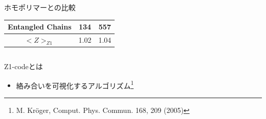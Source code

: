 \documentclass[12pt, dvipdfmx]{beamer}
\begin{document}
\begin{frame}
\begin{columns}[T, onlytextwidth]
\begin{block}{ホモポリマーとの比較}
\begin{center}
\begin{tabular}{c||c|c}
                        Entangled Chains&134&557 \\ \hline
                        \alert{$<Z>_{Z1}$}&\alert{1.02}& \alert{1.04}\\ \hline
                    \end{tabular}
                \end{center}
            \end{block}
        \end{columns}
    \begin{alertblock}{Z1-codeとは}
        \begin{itemize}
            \item 絡み合いを可視化するアルゴリズム\footnote{
                M. Kröger, Comput. Phys. Commun. 168, 209 (2005)
            }
        \end{itemize}
    \end{alertblock}
\end{frame}
\end{document}
